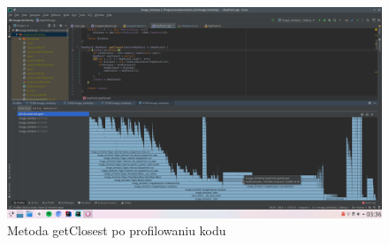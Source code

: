 \documentclass{article}
\begin{document}
	\begin{figure}[H]
		\centering
		\includegraphics[width=\linewidth]{after3.png}
		\caption{Metoda getClosest po profilowaniu kodu}
		\label{fig:after2}
	\end{figure}
\end{document}
